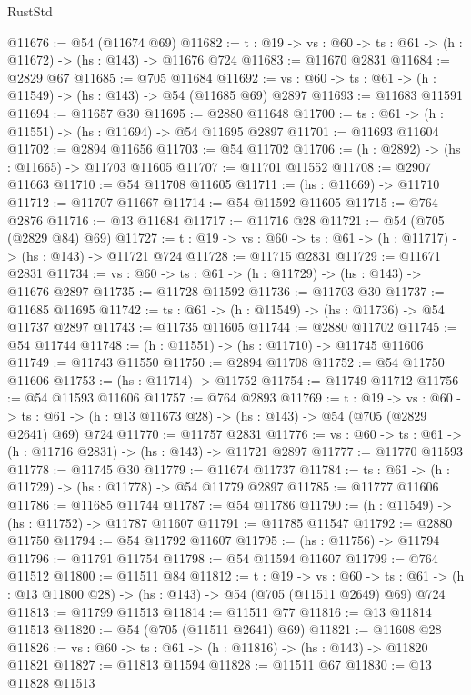 \begin{lexlean}{RustStd}
\begin{coremodule}
@11676 := @54 (@11674 @69)
@11682 := {t : @19} -> {vs : @60} -> {ts : @61} -> (h : @11672) -> (hs : @143) -> @11676 @724
@11683 := @11670 @2831
@11684 := @2829 @67
@11685 := @705 @11684
@11692 := {vs : @60} -> {ts : @61} -> (h : @11549) -> (hs : @143) -> @54 (@11685 @69) @2897
@11693 := @11683 @11591
@11694 := @11657 @30
@11695 := @2880 @11648
@11700 := {ts : @61} -> (h : @11551) -> (hs : @11694) -> @54 @11695 @2897
@11701 := @11693 @11604
@11702 := @2894 @11656
@11703 := @54 @11702
@11706 := (h : @2892) -> (hs : @11665) -> @11703 @11605
@11707 := @11701 @11552
@11708 := @2907 @11663
@11710 := @54 @11708 @11605
@11711 := (hs : @11669) -> @11710
@11712 := @11707 @11667
@11714 := @54 @11592 @11605
@11715 := @764 @2876
@11716 := @13 @11684
@11717 := @11716 @28
@11721 := @54 (@705 (@2829 @84) @69)
@11727 := {t : @19} -> {vs : @60} -> {ts : @61} -> (h : @11717) -> (hs : @143) -> @11721 @724
@11728 := @11715 @2831
@11729 := @11671 @2831
@11734 := {vs : @60} -> {ts : @61} -> (h : @11729) -> (hs : @143) -> @11676 @2897
@11735 := @11728 @11592
@11736 := @11703 @30
@11737 := @11685 @11695
@11742 := {ts : @61} -> (h : @11549) -> (hs : @11736) -> @54 @11737 @2897
@11743 := @11735 @11605
@11744 := @2880 @11702
@11745 := @54 @11744
@11748 := (h : @11551) -> (hs : @11710) -> @11745 @11606
@11749 := @11743 @11550
@11750 := @2894 @11708
@11752 := @54 @11750 @11606
@11753 := (hs : @11714) -> @11752
@11754 := @11749 @11712
@11756 := @54 @11593 @11606
@11757 := @764 @2893
@11769 := {t : @19} ->
  {vs : @60} ->
  {ts : @61} -> (h : @13 @11673 @28) -> (hs : @143) -> @54 (@705 (@2829 @2641) @69) @724
@11770 := @11757 @2831
@11776 := {vs : @60} -> {ts : @61} -> (h : @11716 @2831) -> (hs : @143) -> @11721 @2897
@11777 := @11770 @11593
@11778 := @11745 @30
@11779 := @11674 @11737
@11784 := {ts : @61} -> (h : @11729) -> (hs : @11778) -> @54 @11779 @2897
@11785 := @11777 @11606
@11786 := @11685 @11744
@11787 := @54 @11786
@11790 := (h : @11549) -> (hs : @11752) -> @11787 @11607
@11791 := @11785 @11547
@11792 := @2880 @11750
@11794 := @54 @11792 @11607
@11795 := (hs : @11756) -> @11794
@11796 := @11791 @11754
@11798 := @54 @11594 @11607
@11799 := @764 @11512
@11800 := @11511 @84
@11812 := {t : @19} ->
  {vs : @60} ->
  {ts : @61} -> (h : @13 @11800 @28) -> (hs : @143) -> @54 (@705 (@11511 @2649) @69) @724
@11813 := @11799 @11513
@11814 := @11511 @77
@11816 := @13 @11814 @11513
@11820 := @54 (@705 (@11511 @2641) @69)
@11821 := @11608 @28
@11826 := {vs : @60} -> {ts : @61} -> (h : @11816) -> (hs : @143) -> @11820 @11821
@11827 := @11813 @11594
@11828 := @11511 @67
@11830 := @13 @11828 @11513

\end{coremodule}
\end{lexlean}
